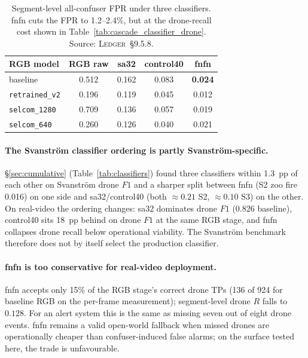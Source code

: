 \documentclass[12pt,a4paper,oneside,openright]{book}
\begin{document}
\begin{table}[htbp]
    \centering
    \caption{Segment-level all-confuser FPR under three classifiers. fnfn cuts the FPR to 1.2--2.4\%, but at the drone-recall cost shown in Table~\ref{tab:cascade_classifier_drone}. Source: \textsc{Ledger}~\S9.5.8.}
    \label{tab:cascade_classifier_fpr}
    \begin{tabular}{lcccc}
        \toprule
        RGB model & RGB raw & sa32 & control40 & fnfn \\
        \midrule
        baseline           & 0.512 & 0.162 & 0.083 & \textbf{0.024} \\
        \texttt{retrained\_v2} & 0.196 & 0.119 & 0.045 & 0.012 \\
        \texttt{selcom\_1280}  & 0.709 & 0.136 & 0.057 & 0.019 \\
        \texttt{selcom\_640}   & 0.260 & 0.126 & 0.040 & 0.021 \\
        \bottomrule
    \end{tabular}
\end{table}

\paragraph{The Svanstr\"om classifier ordering is partly Svanstr\"om-specific.}
\S\ref{sec:cumulative} (Table~\ref{tab:classifiers}) found three classifiers within 1.3~pp of each other on Svanstr\"om drone $F1$ and a sharper split between fnfn (S2 zoo fire 0.016) on one side and sa32/control40 (both $\approx 0.21$ S2, $\approx 0.10$ S3) on the other. On real-video the ordering changes: sa32 dominates drone $F1$ (0.826 baseline), control40 sits 18~pp behind on drone $F1$ at the same RGB stage, and fnfn collapses drone recall below operational viability. The Svanstr\"om benchmark therefore does not by itself select the production classifier.

\paragraph{fnfn is too conservative for real-video deployment.}
fnfn accepts only 15\% of the RGB stage's correct drone TPs (136 of 924 for baseline RGB on the per-frame measurement); segment-level drone $R$ falls to $0.128$. For an alert system this is the same as missing seven out of eight drone events. fnfn remains a valid open-world fallback when missed drones are operationally cheaper than confuser-induced false alarms; on the surface tested here, the trade is unfavourable.
\end{document}
